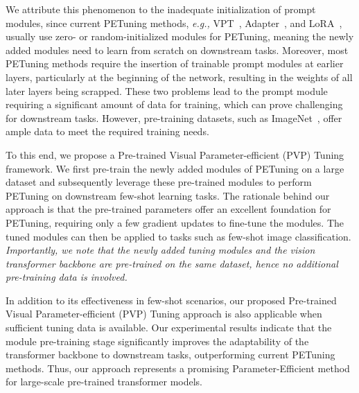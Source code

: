 \documentclass[10pt,journal,letterpaper,compsoc]{IEEEtran}
\begin{document}
We attribute this phenomenon to the inadequate initialization of prompt modules, since current PETuning methods, \textit{e.g.,} VPT~\cite{vpt}, Adapter~\cite{adapter}, and LoRA~\cite{Lora}, usually use zero- or random-initialized modules for PETuning, meaning the newly added modules need to learn from scratch on downstream tasks. Moreover, most PETuning methods require the insertion of trainable prompt modules at earlier layers, particularly at the beginning of the network, resulting in the weights of all later layers being scrapped. These two problems lead to the prompt module requiring a significant amount of data for training, which can prove challenging for downstream tasks. However, pre-training datasets, such as ImageNet~\cite{russakovsky2015imagenet}, offer ample data to meet the required training needs.

To this end, we propose a Pre-trained Visual Parameter-efficient (PVP) Tuning  framework. We first pre-train the newly added modules of PETuning on a large dataset and subsequently  leverage these pre-trained modules to perform PETuning on downstream few-shot learning tasks. The rationale behind our approach is that the pre-trained parameters offer an excellent foundation for PETuning, requiring only a few gradient updates to fine-tune the modules. The tuned modules can then be applied to tasks such as few-shot image classification. \textit{ Importantly, we note that the newly added tuning modules and the vision transformer backbone are pre-trained on the same dataset, hence no additional pre-training data is involved.}



In addition to its effectiveness in few-shot scenarios, our proposed Pre-trained Visual Parameter-efficient (PVP) Tuning approach is also applicable when sufficient tuning data is available. Our experimental results indicate that the module pre-training stage significantly improves the adaptability of the transformer backbone to downstream tasks, outperforming current PETuning methods. Thus, our approach represents a promising Parameter-Efficient method for large-scale pre-trained transformer models.
\end{document}
